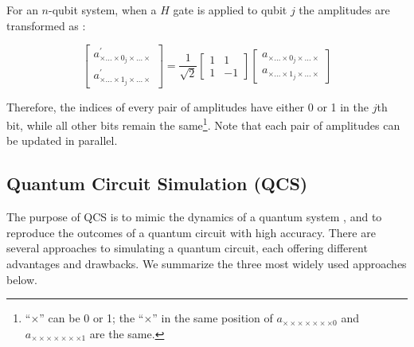 \noindent For an $n$-qubit system, when a $H$ gate is applied to qubit $j$ the amplitudes are transformed as \cite{10.1016/j.cpc.2006.08.007}:


\begin{equation}
\begin{bmatrix} a_{\times\dots\times0_{j}\times\dots\times}^{\prime} \\ a_{\times\dots\times1_{j}\times\dots\times}^{\prime} \end{bmatrix} = \frac{1}{\sqrt{2}} \begin{bmatrix} 1 & 1 \\ 1 & -1 \end{bmatrix} \begin{bmatrix} a_{\times\dots\times0_{j}\times\dots\times} \\ a_{\times\dots\times1_{j}\times\dots\times} \end{bmatrix}
\label{eq:amplituesupdate}
\end{equation}

\noindent  
Therefore, the indices of every pair of amplitudes have either 0 or 1 in the $j$th bit, while all other bits remain the same\footnote{``$\times$'' can be 0 or 1; the ``$\times$'' in the same position of $a_{\times\times\times\times\times\times\times0}$ and $a_{\times\times\times\times\times\times\times1}$ are the same.}. Note that each pair of amplitudes can be updated in parallel. 

\subsection{Quantum Circuit Simulation (QCS)}

The purpose of QCS is to mimic the dynamics of a quantum system \cite{10.1007/978-3-031-01765-0}, and to reproduce the outcomes of a quantum circuit with high accuracy. There are several approaches to simulating a quantum circuit, each offering different advantages and drawbacks. We summarize the three most widely used approaches below. 

